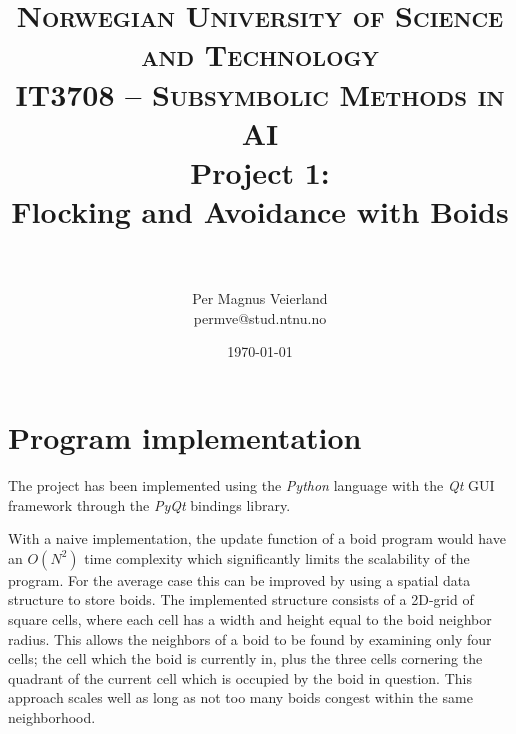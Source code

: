 

\usepackage{relsize} %

\def\tabularxcolumn#1{m{#1}}

\title{
\normalfont \normalsize
\textsc{Norwegian University of Science and Technology\\IT3708 -- Subsymbolic Methods in AI}
\horrule{0.5pt} \\[0.4cm]
\huge Project 1:\\ Flocking and Avoidance with Boids\\
\horrule{2pt} \\[0.5cm]
}

\author{Per Magnus Veierland\\permve@stud.ntnu.no}

\date{\normalsize\today}




\fancyfoot[C]{}
\maketitle

\newpage
{} %
\setcounter{page}{1}

\section*{Program implementation}

The project has been implemented using the \textit{Python} language with the \textit{Qt} \ac{GUI} framework through the \textit{PyQt} bindings library.

With a naive implementation, the update function of a boid program would have an $O(N^2)$ time complexity which significantly limits the scalability of the program. For the average case this can be improved by using a spatial data structure to store boids. The implemented structure consists of a 2D-grid of square cells, where each cell has a width and height equal to the boid neighbor radius. This allows the neighbors of a boid to be found by examining only four cells; the cell which the boid is currently in, plus the three cells cornering the quadrant of the current cell which is occupied by the boid in question. This approach scales well as long as not too many boids congest within the same neighborhood.

